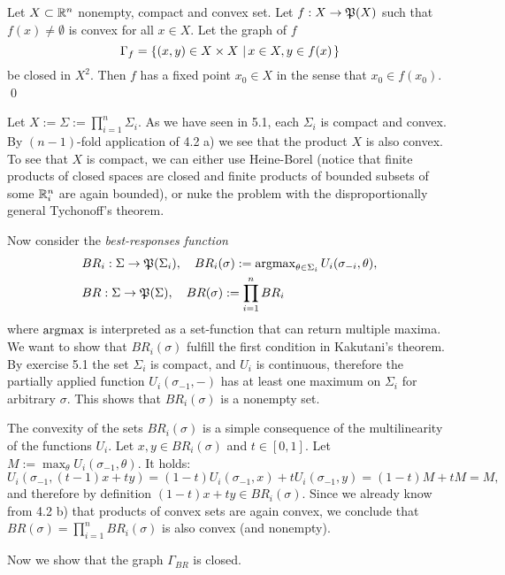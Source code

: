\documentclass{scrartcl}
\begin{document}
  Let $X\subset \mathbb{R}^n$ nonempty, compact and convex set.
  Let $f: X\to \mathfrak{P}(X)$ such that $f(x) \neq \emptyset$ is convex for all
  $x\in X$. Let the graph of $f$
  \[
    \Gamma_f = {\left\{(x, y)\in X\times X\,\left\vert\, x\in X, y\in f(x)\right.\right\}}
  \]
  be closed in $X^2$.
  Then $f$ has a fixed point $x_0\in X$ in the sense that $x_0\in f(x_0)$.
\hfill \qed

\vspace{1em}

Let $X := \Sigma := \prod_{i=1}^n \Sigma_i$.
As we have seen in 5.1, each $\Sigma_i$ is compact and convex. 
By $(n - 1)$-fold application of 4.2 a) we see that the product $X$ is also convex.
To see that $X$ is compact, we can either use Heine-Borel (notice that finite products of closed spaces are closed and finite products of bounded subsets of some $\mathbb{R}^n_i$ are again bounded), or nuke the problem with the disproportionally general Tychonoff's theorem.

 Now consider the \emph{best-responses function}
\begin{align*}
  &BR_i: \Sigma \to \mathfrak{P}(\Sigma_i), \quad
  BR_i(\sigma) := \operatorname{argmax}_{\theta\in\Sigma_i} U_i(\sigma_{-i}, \theta), \\
  &BR: \Sigma \to \mathfrak{P}(\Sigma), \quad
  BR(\sigma) := \prod_{i=1}^n BR_i
\end{align*}
where $\operatorname{argmax}$ is interpreted as a set-function that can return multiple maxima.
We want to show that $BR_i(\sigma)$ fulfill the first condition in Kakutani's
theorem. By exercise 5.1 the set $\Sigma_i$ is compact, and $U_i$ is 
continuous, therefore the partially applied function $U_i(\sigma_{-1}, -)$ 
has at least one maximum on $\Sigma_i$ for arbitrary $\sigma$.
This shows that $BR_i(\sigma)$ is a nonempty set. 

The convexity of the sets $BR_i(\sigma)$ is a simple consequence of the 
multilinearity of the functions $U_i$. 
Let $x, y\in BR_i(\sigma)$ and $t\in[0, 1]$. 
Let $M := \max_\theta U_i(\sigma_{-1}, \theta)$.
It holds:
\[
  U_i(\sigma_{-1}, (t - 1)x + t y) = 
  (1 - t) U_i(\sigma_{-1}, x) + t U_i(\sigma_{-1}, y) = (1 - t) M + t M = M,
\]
and therefore by definition $(1-t)x + ty\in BR_i(\sigma)$. Since we already 
know from 4.2 b) that products of convex sets are again convex, we conclude 
that $BR(\sigma) = \prod_{i=1}^n BR_i(\sigma)$ is also convex (and
nonempty).

 Now we show that the graph $\Gamma_{BR}$ is closed.
\end{document}
